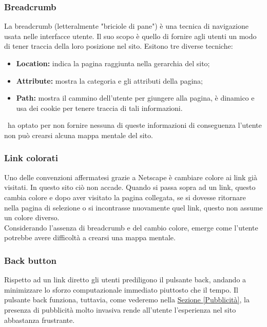 \subsubsection{Breadcrumb}
La breadcrumb (letteralmente "briciole di pane") è una tecnica di navigazione usata nelle interfacce utente. Il suo scopo è quello di fornire agli utenti un modo di tener traccia della loro posizione nel sito. 
Esitono tre diverse tecniche:
\begin{itemize}
	\item \textbf{Location:} indica la pagina raggiunta nella gerarchia del sito;
	\item \textbf{Attribute:} mostra la categoria e gli attributi della pagina;
	\item \textbf{Path:} mostra il cammino dell'utente per giungere alla pagina, è dinamico e usa dei cookie per tenere traccia di tali informazioni.
\end{itemize}
\nomeSito\ ha optato per non fornire nessuna di queste informazioni di conseguenza l'utente non può crearsi alcuna mappa mentale del sito.

\subsubsection{Link colorati}
Uno delle convenzioni affermatesi grazie a Netscape è cambiare colore ai link già visitati. In questo sito ciò non accade. Quando si passa sopra ad un link, questo cambia colore e dopo aver visitato la pagina collegata, se si dovesse ritornare nella pagina di selezione o si incontrasse nuovamente quel link, questo non assume un colore diverso. \\
Considerando l'assenza di breadcrumb e del cambio colore, emerge come l'utente potrebbe avere difficoltà a crearsi una mappa mentale.

\subsubsection{Back button}
Rispetto ad un link diretto gli utenti prediligono il pulsante back, andando a minimizzare lo sforzo computazionale immediato piuttosto che il tempo. Il pulsante back funziona, tuttavia, come vederemo nella \hyperref[Pubblicità]{Sezione \ref{Pubblicità}}, la presenza di pubblicità molto invasiva rende all'utente l'esperienza nel sito abbastanza frustrante.
